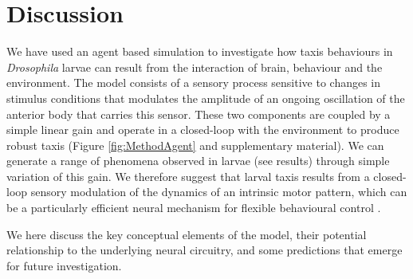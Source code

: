 \documentclass[11pt,a4paper]{article}
\newcommand{\Dros }{\emph{Drosophila }}
\begin{document}
\section{Discussion}
We have used an agent based simulation to investigate how taxis behaviours in \Dros larvae can result from the interaction of brain, behaviour and the environment. 
 The model consists of a sensory process sensitive to changes in stimulus conditions that modulates the amplitude of an ongoing oscillation of the anterior body that carries this sensor.
These two components are coupled by a simple linear gain and operate in a closed-loop with the environment to produce robust taxis (Figure \ref{fig:MethodAgent} and supplementary material). We can generate a range of phenomena observed in larvae (see results) through simple variation of this gain.
We therefore suggest that larval taxis results from a closed-loop sensory modulation of the dynamics of an intrinsic motor pattern, which can be a particularly efficient neural mechanism for flexible behavioural control \citep{lemon2015whole,izquierdo2010evolution,kanzaki1996behavioral,levi2005role,willis1997active}. 

 We here discuss the key conceptual elements of the model, their potential relationship to the underlying neural circuitry, and some predictions that emerge for future investigation.
\end{document}

